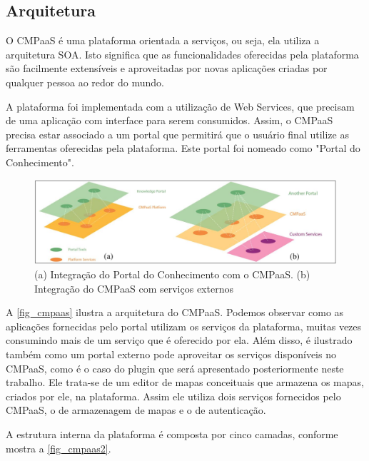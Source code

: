 \documentclass[
	12pt,				%
	openright,			%
	oneside,			%
	a4paper,			%
	english,			%
	french,				%
	spanish,			%
	brazil				%
	]{abntex2}
\begin{document}
\subsection{Arquitetura}

O CMPaaS é uma plataforma orientada a serviços, ou seja, ela utiliza a arquitetura SOA. Isto significa que as funcionalidades oferecidas pela plataforma são facilmente extensíveis e aproveitadas por novas aplicações criadas por qualquer pessoa ao redor do mundo. 

A plataforma foi implementada com a utilização de Web Services, que precisam de uma aplicação com interface para serem consumidos. Assim, o CMPaaS precisa estar associado a um portal que permitirá que o usuário final utilize as ferramentas oferecidas pela plataforma. Este portal foi nomeado como "Portal do Conhecimento"\cite{Perin2014}. 


\begin{figure}[htb]
	\caption{\label{fig_cmpaas}(a) Integração do Portal do Conhecimento com o CMPaaS. (b) Integração do CMPaaS com serviços externos}
	\begin{center}
		\includegraphics[scale=0.3]{cmpaas.png}
	\end{center}
\end{figure}

A \autoref{fig_cmpaas} ilustra a arquitetura do CMPaaS. Podemos observar como as aplicações fornecidas pelo portal utilizam os serviços da plataforma, muitas vezes consumindo mais de um serviço que é oferecido por ela. Além disso, é ilustrado também como um portal externo pode aproveitar os serviços disponíveis no CMPaaS, como é o caso do plugin que será apresentado posteriormente neste trabalho. Ele trata-se de um editor de mapas conceituais que armazena os mapas, criados por ele, na plataforma. Assim ele utiliza dois serviços fornecidos pelo CMPaaS, o de armazenagem de mapas e o de autenticação. 

A estrutura interna da plataforma é composta por cinco camadas\cite{Perin2014}, conforme mostra a \autoref{fig_cmpaas2}.
\end{document}
